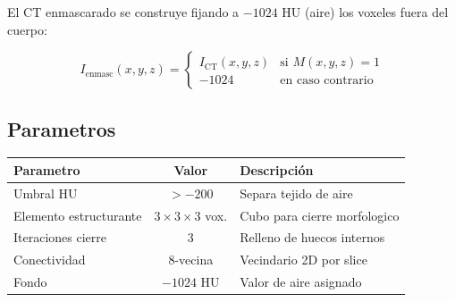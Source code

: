 \documentclass[12pt,a4paper]{article}
\begin{document}
El CT enmascarado se construye fijando a $-1024$ HU (aire) los voxeles fuera del cuerpo:

\begin{equation}\label{eq:ct_masked}
    I_{\text{enmasc}}(x,y,z) = \begin{cases}
        I_{\text{CT}}(x,y,z) & \text{si } M(x,y,z) = 1 \\
        -1024 & \text{en caso contrario}
    \end{cases}
\end{equation}

\subsection{Parametros}

\begin{table}[H]
\centering
\begin{tabular}{l c l}
\toprule
\textbf{Parametro} & \textbf{Valor} & \textbf{Descripción} \\
\midrule
Umbral HU & $>-200$ & Separa tejido de aire \\
Elemento estructurante & $3\times3\times3$ vox. & Cubo para cierre morfologico \\
Iteraciones cierre & 3 & Relleno de huecos internos \\
Conectividad & 8-vecina & Vecindario 2D por slice \\
Fondo & $-1024$ HU & Valor de aire asignado \\
\bottomrule
\end{tabular}
\end{table}
\end{document}
